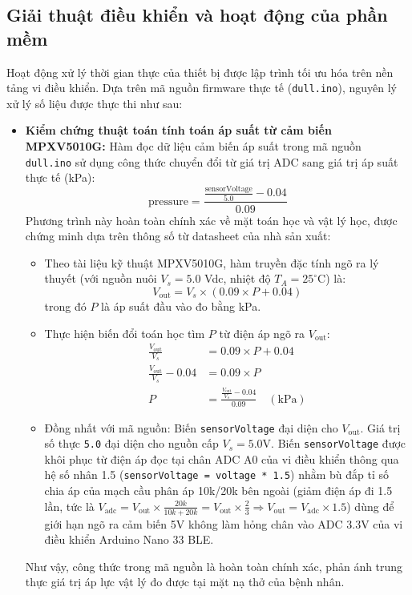 \documentclass[12pt,a4paper]{article}
\begin{document}
\vspace{1.5em}

\subsection{Giải thuật điều khiển và hoạt động của phần mềm}
Hoạt động xử lý thời gian thực của thiết bị được lập trình tối ưu hóa trên nền tảng vi điều khiển. Dựa trên mã nguồn firmware thực tế (\texttt{dull.ino}), nguyên lý xử lý số liệu được thực thi như sau:

\begin{itemize}
    \item \textbf{Kiểm chứng thuật toán tính toán áp suất từ cảm biến MPXV5010G:}
    Hàm đọc dữ liệu cảm biến áp suất trong mã nguồn \texttt{dull.ino} sử dụng công thức chuyển đổi từ giá trị ADC sang giá trị áp suất thực tế (kPa):
    \begin{equation}
        \text{pressure} = \frac{\frac{\text{sensorVoltage}}{5.0} - 0.04}{0.09}
    \end{equation}
    Phương trình này hoàn toàn chính xác về mặt toán học và vật lý học, được chứng minh dựa trên thông số từ datasheet của nhà sản xuất:
    \begin{itemize}
        \item Theo tài liệu kỹ thuật MPXV5010G, hàm truyền đặc tính ngõ ra lý thuyết (với nguồn nuôi $V_s = 5.0$ Vdc, nhiệt độ $T_A = 25^\circ$C) là:
        \begin{equation}
            V_{\text{out}} = V_s \times (0.09 \times P + 0.04)
        \end{equation}
        trong đó $P$ là áp suất đầu vào đo bằng kPa.
        \item Thực hiện biến đổi toán học tìm $P$ từ điện áp ngõ ra $V_{\text{out}}$:
        \begin{align}
            \frac{V_{\text{out}}}{V_s} &= 0.09 \times P + 0.04 \\
            \frac{V_{\text{out}}}{V_s} - 0.04 &= 0.09 \times P \\
            P &= \frac{\frac{V_{\text{out}}}{V_s} - 0.04}{0.09} \quad (\text{kPa})
        \end{align}
        \item Đồng nhất với mã nguồn: Biến \texttt{sensorVoltage} đại diện cho $V_{\text{out}}$. Giá trị số thực \texttt{5.0} đại diện cho nguồn cấp $V_s = 5.0$V. Biến \texttt{sensorVoltage} được khôi phục từ điện áp đọc tại chân ADC A0 của vi điều khiển thông qua hệ số nhân 1.5 (\texttt{sensorVoltage = voltage * 1.5}) nhằm bù đắp tỉ số chia áp của mạch cầu phân áp 10k/20k bên ngoài (giảm điện áp đi 1.5 lần, tức là $V_{\text{adc}} = V_{\text{out}} \times \frac{20k}{10k + 20k} = V_{\text{out}} \times \frac{2}{3} \Rightarrow V_{\text{out}} = V_{\text{adc}} \times 1.5$) dùng để giới hạn ngõ ra cảm biến 5V không làm hỏng chân vào ADC 3.3V của vi điều khiển Arduino Nano 33 BLE.
    \end{itemize}
    Như vậy, công thức trong mã nguồn là hoàn toàn chính xác, phản ánh trung thực giá trị áp lực vật lý đo được tại mặt nạ thở của bệnh nhân.
    

\end{itemize}
\end{document}
